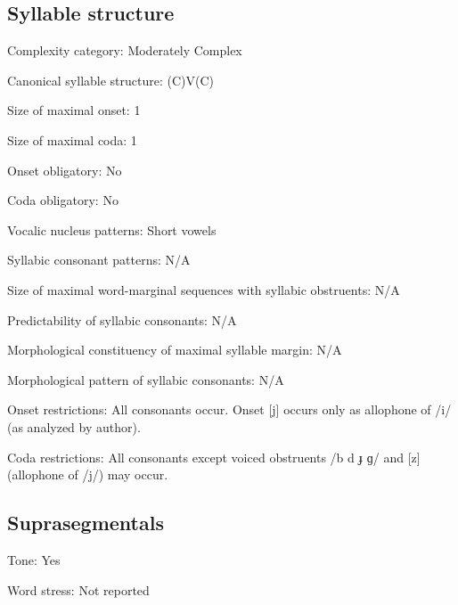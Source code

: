 {\subsection*{Syllable structure}
\begin{appendixdesc}

\item[Complexity category:] Moderately Complex

\item[Canonical syllable structure:] (C)V(C) \citep[53--58]{Jakobi1990}

\item[Size of maximal onset:] 1

\item[Size of maximal coda:] 1

\item[Onset obligatory:] No

\item[Coda obligatory:] No

\item[Vocalic nucleus patterns:] Short vowels

\item[Syllabic consonant patterns:] N/A

\item[Size of maximal word-marginal sequences with syllabic obstruents:] N/A

\item[Predictability of syllabic consonants:] N/A

\item[Morphological constituency of maximal syllable margin:] N/A

\item[Morphological pattern of syllabic consonants:] N/A

\item[Onset restrictions:] All consonants occur. Onset [j] occurs only as allophone of /i/ (as analyzed by author).

\item[Coda restrictions:] All consonants except voiced obstruents /b d ɟ ɡ/ and [z] (allophone of /j/) may occur.
\end{appendixdesc}
\subsection*{Suprasegmentals}
\begin{appendixdesc}
\item[Tone:] Yes

\item[Word stress:] Not reported
\end{appendixdesc}
}
